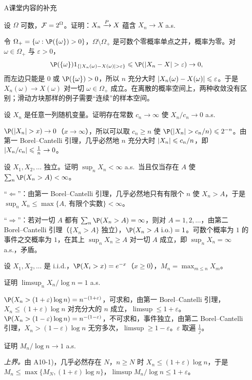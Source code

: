 \begin{exercises}{A}{课堂内容的补充}
\item\label{ex:borel-cantelli:A7} 设 $\Omega$ 可数，$\mathcal{F}=2^\Omega$。证明：$X_n\xrightarrow{P} X$ 蕴含 $X_n\to X$ a.s.
\begin{solution}
令 $\Omega_+=\{\omega:\P(\{\omega\})>0\}$，$\Omega\setminus\Omega_+$ 是可数个零概率单点之并，概率为零。对 $\omega\in\Omega_+$ 与 $\varepsilon>0$，
\[
\P(\{\omega\})\one_{\{\abs{X_n(\omega)-X(\omega)}>\varepsilon\}}\leqslant \P(\abs{X_n-X}>\varepsilon)\to0,
\]
而左边只能是 $0$ 或 $\P(\{\omega\})>0$，所以 $n$ 充分大时 $\lvert X_n(\omega)-X(\omega)\rvert\leqslant\varepsilon$。于是 $X_n(\omega)\to X(\omega)$ 对一切 $\omega\in\Omega_+$ 成立。在离散的概率空间上，两种收敛没有区别；滑动方块那样的例子需要“连续”的样本空间。
\end{solution}

\item\label{ex:borel-cantelli:A8} 设 $X_n$ 是任意一列随机变量。证明存在常数 $c_n\to\infty$ 使 $X_n/c_n\to0$ a.s.
\begin{solution}
$\P(\abs{X_n}>x)\to0$（$x\to\infty$），所以可以取 $c_n\geqslant n$ 使 $\P(\abs{X_n}>c_n/n)\leqslant2^{-n}$。由第一 Borel--Cantelli 引理，几乎必然地 $n$ 充分大时 $\lvert X_n\rvert\leqslant c_n/n$，即 $\lvert X_n/c_n\rvert\leqslant\frac1n\to0$。
\end{solution}

\item\label{ex:borel-cantelli:A9} 设 $X_1,X_2,\dots$ 独立。证明 $\sup_nX_n<\infty$ a.s.\ 当且仅当存在 $A$ 使 $\sum_n\P(X_n>A)<\infty$。
\begin{solution}
“$\Leftarrow$”：由第一 Borel--Cantelli 引理，几乎必然地只有有限个 $n$ 使 $X_n>A$，于是 $\sup_nX_n\leqslant\max\{A,\ \text{有限个实数}\}<\infty$。

“$\Rightarrow$”：若对一切 $A$ 都有 $\sum_n\P(X_n>A)=\infty$，则对 $A=1,2,\dots$，由第二 Borel--Cantelli 引理（$\{X_n>A\}$ 独立），$\P(X_n>A\ \text{i.o.})=1$。可数个概率为 $1$ 的事件之交概率为 $1$，在其上 $\sup_nX_n\geqslant A$ 对一切 $A$ 成立，即 $\sup_nX_n=\infty$ a.s.，矛盾。
\end{solution}

\item\label{ex:borel-cantelli:A10} 设 $X_1,X_2,\dots$ 是 i.i.d.，$\P(X_i>x)=e^{-x}$（$x\geqslant0$），$M_n=\max_{m\leqslant n}X_m$。
\begin{questions}
\item 证明 $\limsup_nX_n/\log n=1$ a.s.
\begin{solution}
$\P(X_n>(1+\varepsilon)\log n)=n^{-(1+\varepsilon)}$，可求和，由第一 Borel--Cantelli 引理，$X_n\leqslant(1+\varepsilon)\log n$ 对充分大的 $n$ 成立，$\limsup\leqslant1+\varepsilon$。$\P(X_n>(1-\varepsilon)\log n)=n^{-(1-\varepsilon)}$，不可求和，事件独立，由第二 Borel--Cantelli 引理，$X_n>(1-\varepsilon)\log n$ 无穷多次，$\limsup\geqslant1-\varepsilon$。$\varepsilon$ 取遍 $\frac1j$。
\end{solution}
\item 证明 $M_n/\log n\to1$ a.s.
\begin{solution}
\emph{上界。}由 A10-1)，几乎必然存在 $N$，$n\geqslant N$ 时 $X_n\leqslant(1+\varepsilon)\log n$，于是 $M_n\leqslant\max\{M_N,(1+\varepsilon)\log n\}$，$\limsup M_n/\log n\leqslant1+\varepsilon$。


\end{solution}
\end{questions}
\end{exercises}
